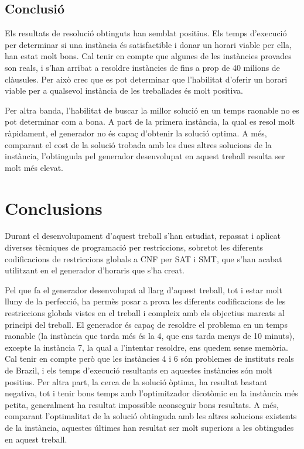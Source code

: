 \documentclass[11pt,a4paper,twoside]{report}
\begin{document}
  \section{Conclusió}

  Els resultats de resolució obtinguts han semblat positius. 
  Els temps d'execució per determinar si una instància és satisfactible i donar un horari viable per ella, han estat molt bons. 
  Cal tenir en compte que algunes de les instàncies provades son reals, i s'han arribat a resoldre instàncies de fins a prop de 40 milions de clàusules.
  Per això crec que es pot determinar que l'habilitat d'oferir un horari viable per a qualsevol instància de les treballades és molt positiva.

  Per altra banda, l'habilitat de buscar la millor solució en un temps raonable 
  no es pot determinar com a bona. A part de la primera instància, 
  la qual es resol molt ràpidament, el generador no és capaç d'obtenir la solució optima.
   A més, comparant el cost de la solució trobada amb les dues altres solucions de la instància, l'obtinguda pel generador desenvolupat en aquest treball resulta ser molt més elevat.








  \chapter{Conclusions}

  Durant el desenvolupament d'aquest treball s'han estudiat, repassat i aplicat diverses tècniques de programació per restriccions, 
  sobretot les diferents codificacions de restriccions globals a CNF per SAT i SMT, que s'han acabat utilitzant en el generador d'horaris que s'ha creat. 

  Pel que fa el generador desenvolupat al llarg d'aquest treball, tot i estar molt lluny de la perfecció, 
  ha permès posar a prova les diferents codificacions de les restriccions globals vistes en el treball 
  i compleix amb els objectius marcats al principi del treball. El generador és capaç de resoldre el problema en un temps raonable (la instància que tarda més és la 4, que ens tarda menys de 10 minuts), 
  excepte la instància 7, la qual a l'intentar resoldre, ens quedem sense memòria. Cal tenir en compte però que les instàncies 4 i 6 són problemes de instituts reals de Brazil, i els temps d'execució resultants en aquestes instàncies són molt positius.
  Per altra part, la cerca de la solució òptima, ha resultat bastant negativa, tot i tenir bons temps amb l'optimitzador dicotòmic en la instància més petita, generalment ha resultat impossible aconseguir bons resultats. 
  A més, comparant l'optimalitat de la solució obtinguda amb les altres solucions existents de la instància, aquestes últimes han resultat ser molt superiors a les obtingudes en aquest treball.
\end{document}
